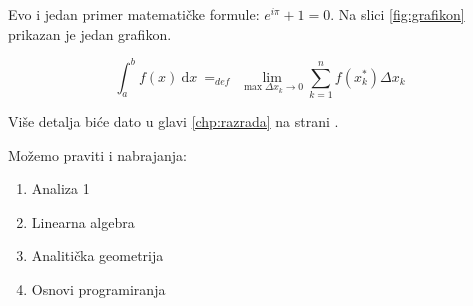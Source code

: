 Evo i jedan primer matematičke formule: $e^{i\pi} + 1 = 0$. 
Na slici \ref{fig:grafikon} prikazan je jedan grafikon.

$$
\int_a^b f(x)\ \mathrm{d}x \ =_{def}\ \lim_{\max{\Delta x_k \rightarrow 0}} \sum_{k=1}^n f(x_k^*)\Delta x_k
$$

Više detalja biće dato u glavi \ref{chp:razrada} na strani \pageref{chp:razrada}.

Možemo praviti i nabrajanja:
\begin{enumerate}
\item Analiza 1
\item Linearna algebra
\item Analitička geometrija
\item Osnovi programiranja
\end{enumerate}

\pangrami
